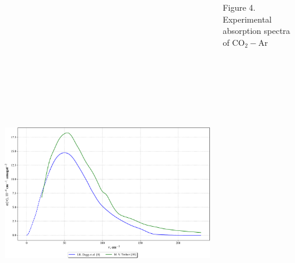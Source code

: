 \documentclass[
  20pt,
  a0paper,
  portrait,
  margin=0mm,
  innermargin=15mm,
  blockverticalspace=0mm,
  colspace=0mm,
  subcolspace=0mm
]{tikzposter}
\begin{document}
\begin{columns}
{{\begin{minipage}{0.5\linewidth}
\begin{center}
\end{center}
\end{minipage}
\begin{minipage}{0.5\linewidth}
\begin{tikzfigure}
		\includegraphics[height=17cm,width=\linewidth]{../pictures/spec_picture/spec_picture-crop.pdf}
\end{tikzfigure}
		\vspace*{-1cm}
		\begin{center}
				Figure 4. Experimental absorption spectra of CO$_2-$Ar 
		\end{center}
\end{minipage}

\vspace{1cm}

}}
\end{columns}
\end{document}
